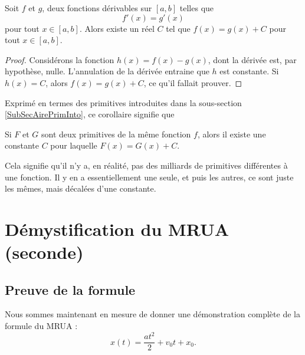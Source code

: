 \begin{corollary}
	Soit $f$ et $g$, deux fonctions dérivables sur $[a,b]$ telles que
	\begin{equation}
		f'(x) = g'(x)
	\end{equation}
	pour tout $x \in [a,b]$. Alors existe un réel $C$ tel que $f (x) = g (x) + C$ pour tout $x\in [a,b]$.
\end{corollary}

\begin{proof}
	Considérons la fonction $h(x)=f(x)-g(x)$, dont la dérivée est, par hypothèse, nulle. L'annulation de la dérivée entraine que $h$ est  constante. Si $h(x)=C$, alors $f(x)=g(x)+C$, ce qu'il fallait prouver.
\end{proof}
\addtocounter{numtho}{-1}

Exprimé en termes des primitives introduites dans la sous-section \ref{SubSecAirePrimInto}, ce corollaire signifie que
\begin{corollary}[bis]	\label{CorZeroCst}
	Si $F$ et $G$ sont deux primitives de la même fonction $f$, alors il existe une constante $C$ pour laquelle $F(x)=G(x)+C$.
\end{corollary}
Cela signifie qu'il n'y a, en réalité, pas des milliards de primitives différentes à une fonction. Il y en a essentiellement une seule, et puis les autres, ce sont juste les mêmes, mais décalées d'une constante.

					\section{Démystification du MRUA (seconde)}

					\subsection{Preuve de la formule}

Nous sommes maintenant en mesure de donner une démonstration complète de la formule du MRUA :
\begin{equation}	\label{EqMRUAINT}
	x(t) = \frac{ at^2 }{ 2 } + v_0t +x_0.
\end{equation}

